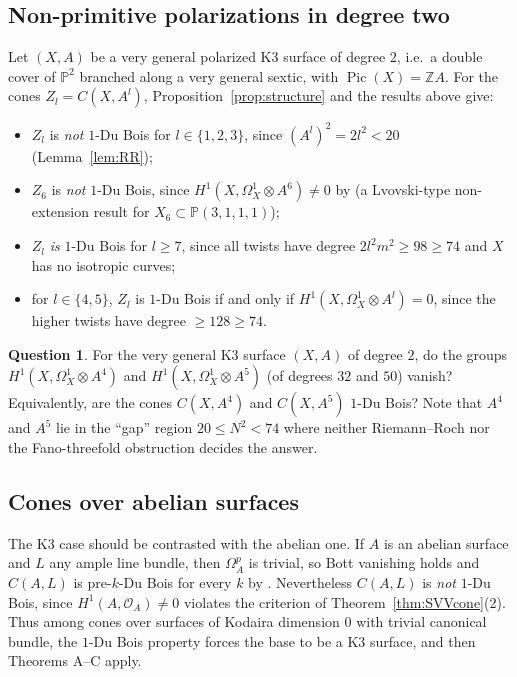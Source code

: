 \documentclass[11pt]{amsart}
\numberwithin{equation}{section}
\theoremstyle{plain}
\theoremstyle{definition}
\newtheorem{question}[theorem]{Question}
\theoremstyle{remark}
\newcommand{\ZZ}{\mathbb{Z}}
\newcommand{\PP}{\mathbb{P}}
\newcommand{\cO}{\mathcal{O}}
\newcommand{\Pic}{\operatorname{Pic}}
\begin{document}
\subsection{Non-primitive polarizations in degree two}
Let $(X,A)$ be a very general polarized K3 surface of degree $2$, i.e.\ a double cover of $\PP^2$ branched along a very general sextic, with $\Pic(X)=\ZZ A$.
For the cones $Z_l=C(X,A^l)$, Proposition~\ref{prop:structure} and the results above give:
\begin{itemize}
\item $Z_l$ is \emph{not} $1$-Du Bois for $l\in\{1,2,3\}$, since $(A^l)^2=2l^2<20$ (Lemma~\ref{lem:RR});
\item $Z_6$ is \emph{not} $1$-Du Bois, since $H^1(X,\Omega^1_X\otimes A^6)\ne0$ by \cite[Ex.~5.2]{Tot} (a Lvovski-type non-extension result for $X_6\subset\PP(3,1,1,1)$);
\item $Z_l$ \emph{is} $1$-Du Bois for $l\ge7$, since all twists have degree $2l^2m^2\ge98\ge74$ and $X$ has no isotropic curves;
\item for $l\in\{4,5\}$, $Z_l$ is $1$-Du Bois if and only if $H^1(X,\Omega^1_X\otimes A^l)=0$, since the higher twists have degree $\ge128\ge74$.
\end{itemize}

\begin{question}\label{q:deg2}
For the very general K3 surface $(X,A)$ of degree $2$, do the groups $H^1(X,\Omega^1_X\otimes A^4)$ and $H^1(X,\Omega^1_X\otimes A^5)$ (of degrees $32$ and $50$) vanish?
Equivalently, are the cones $C(X,A^4)$ and $C(X,A^5)$ $1$-Du Bois?
Note that $A^4$ and $A^5$ lie in the ``gap'' region $20\le N^2<74$ where neither Riemann--Roch nor the Fano-threefold obstruction decides the answer.
\end{question}

\subsection{Cones over abelian surfaces}
The K3 case should be contrasted with the abelian one.
If $A$ is an abelian surface and $L$ any ample line bundle, then $\Omega^p_A$ is trivial, so Bott vanishing holds and $C(A,L)$ is pre-$k$-Du Bois for every $k$ by \cite[Cor.~7.6]{SVV}.
Nevertheless $C(A,L)$ is \emph{not} $1$-Du Bois, since $H^1(A,\cO_A)\ne0$ violates the criterion of Theorem~\ref{thm:SVVcone}(2).
Thus among cones over surfaces of Kodaira dimension $0$ with trivial canonical bundle, the $1$-Du Bois property forces the base to be a K3 surface, and then Theorems A--C apply.
\end{document}
